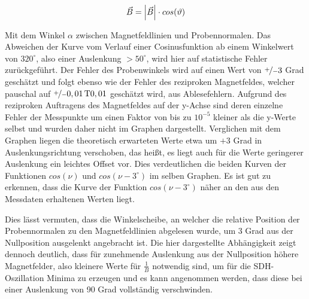 \begin{equation}
	\vec{B} = \left| \vec{B} \right| \cdot cos(\vartheta)
	\label{eq:winkelabh_skalarprodukt}
\end{equation}

Mit dem Winkel $\alpha$ zwischen Magnetfeldlinien und Probennormalen. Das Abweichen der Kurve vom Verlauf einer Cosinusfunktion ab einem Winkelwert von $320^{\circ}$, also einer Auslenkung $>50^{\circ}$, wird hier auf statistische Fehler zurückgeführt. Der Fehler des Probenwinkels wird auf einen Wert von $\nicefrac{+}{-} 3 $ Grad geschätzt und folgt ebenso wie der Fehler des reziproken Magnetfeldes, welcher pauschal auf $\nicefrac{+}{-} \unit[0,01]{T}0,01$ geschätzt wird, aus Ablesefehlern. 
Aufgrund des reziproken Auftragens des Magnetfeldes auf der y-Achse sind deren einzelne Fehler der Messpunkte um einen Faktor von bis zu $10^{-5}$ kleiner als die y-Werte selbst und wurden daher nicht im Graphen dargestellt.
Verglichen mit dem Graphen liegen die theoretisch erwarteten Werte etwa um $+3$ Grad in Auslenkungsrichtung verschoben, das heißt, es liegt auch für die Werte geringerer Auslenkung ein leichtes Offset vor. Dies verdeutlichen die beiden Kurven der Funktionen $cos(\nu)$ und $cos(\nu-3^{\circ})$ im selben Graphen. Es ist gut zu erkennen, dass die Kurve der Funktion $cos(\nu-3^{\circ})$ näher an den aus den Messdaten erhaltenen Werten liegt. 

Dies lässt vermuten, dass die Winkelscheibe, an welcher die relative Position der Probennormalen zu den Magnetfeldlinien abgelesen wurde, um 3 Grad aus der Nullposition ausgelenkt angebracht ist. 
Die hier dargestellte Abhängigkeit zeigt dennoch deutlich, dass für zunehmende Auslenkung aus der Nullposition höhere Magnetfelder, also kleinere Werte für $\frac{1}{B}$ notwendig sind, um für die SDH-Oszillation Minima zu erzeugen und es kann angenommen werden, dass diese bei einer Auslenkung von 90 Grad vollständig verschwinden. 

